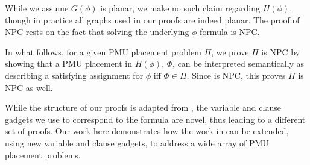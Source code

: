 While we assume $G(\phi)$ is planar, we make no such claim regarding $H(\phi)$, though in practice all graphs used in our proofs are indeed planar. The proof of NPC rests on the fact that solving the underlying $\phi$ formula is NPC.

In what follows, for a given PMU placement problem $\Pi$, we prove $\Pi$ is NPC by showing that a PMU placement in $H(\phi)$, $\Phi$, can be interpreted semantically as describing a satisfying assignment for $\phi$ iff $\Phi\in\Pi$. 
Since \sat is NPC, this proves $\Pi$ is  NPC as well. 


While the structure of our proofs is adapted from \cite{Brueni05}, the variable and clause gadgets we use to correspond to the \sat formula are novel, thus leading to a 
different set of proofs. Our work here demonstrates how the work in \cite{Brueni05} can be extended, using new variable and clause gadgets, to address a wide array of PMU placement problems.

